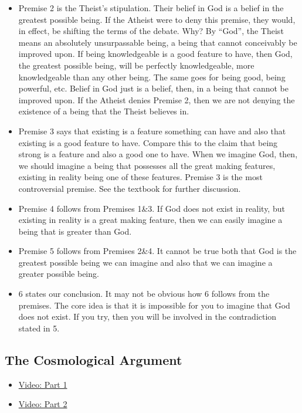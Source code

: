 \documentclass[]{article}
\begin{document}
\begin{itemize}
\item
  Premise 2 is the Theist's stipulation. Their belief in God is a belief
  in the greatest possible being. If the Atheist were to deny this
  premise, they would, in effect, be shifting the terms of the debate.
  Why? By ``God'', the Theist means an absolutely unsurpassable being, a
  being that cannot conceivably be improved upon. If being knowledgeable
  is a good feature to have, then God, the greatest possible being, will
  be perfectly knowledgeable, more knowledgeable than any other being.
  The same goes for being good, being powerful, etc. Belief in God just
  is a belief, then, in a being that cannot be improved upon. If the
  Atheist denies Premise 2, then we are not denying the existence of a
  being that the Theist believes in.
\item
  Premise 3 says that existing is a feature something can have and also
  that existing is a good feature to have. Compare this to the claim
  that being strong is a feature and also a good one to have. When we
  imagine God, then, we should imagine a being that possesses all the
  great making features, existing in reality being one of these
  features. Premise 3 is the most controversial premise. See the
  textbook for further discussion.
\item
  Premise 4 follows from Premises 1\&3. If God does not exist in
  reality, but existing in reality is a great making feature, then we
  can easily imagine a being that is greater than God.
\item
  Premise 5 follows from Premises 2\&4. It cannot be true both that God
  is the greatest possible being we can imagine and also that we can
  imagine a greater possible being.
\item
  6 states our conclusion. It may not be obvious how 6 follows from the
  premises. The core idea is that it is impossible for you to imagine
  that God does not exist. If you try, then you will be involved in the
  contradiction stated in 5.
\end{itemize}

\subsection{The Cosmological Argument}\label{the-cosmological-argument}

\begin{itemize}
\itemsep1pt\parskip0pt
\item
  \href{https://www.youtube.com/watch?v=2zS1HiuWPMA}{Video: Part 1}
\item
  \href{https://www.youtube.com/watch?v=mBMAMIFw9n4}{Video: Part 2}
\end{itemize}
\end{document}
